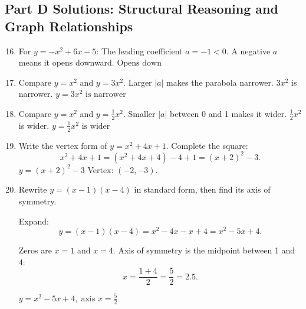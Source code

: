 \documentclass[12pt]{article}
\begin{document}
\subsection*{Part D Solutions: Structural Reasoning and Graph Relationships}
\begin{enumerate}
  \setcounter{enumi}{15}
  \item For \(y = -x^2 + 6x - 5\):  
  The leading coefficient \(a = -1 < 0\).  
  A negative \(a\) means it opens downward.  
  \(\boxed{\text{Opens down}}\)

  \item Compare \(y = x^2\) and \(y = 3x^2\).  
  Larger \(|a|\) makes the parabola narrower.  
  \(3x^2\) is narrower.  
  \(\boxed{y = 3x^2 \text{ is narrower}}\)

  \item Compare \(y = x^2\) and \(y = \tfrac{1}{2}x^2\).  
  Smaller \(|a|\) between 0 and 1 makes it wider.  
  \(\tfrac{1}{2}x^2\) is wider.  
  \(\boxed{y = \tfrac{1}{2}x^2 \text{ is wider}}\)

  \item Write the vertex form of \(y = x^2 + 4x + 1\).  
  Complete the square:  
  \[
  x^2 + 4x + 1 = (x^2 + 4x + 4) - 4 + 1 = (x + 2)^2 - 3.
  \]
  \(\boxed{y = (x + 2)^2 - 3}\)  
  Vertex: \((-2, -3)\).

  \item Rewrite \(y = (x - 1)(x - 4)\) in standard form, then find its axis of symmetry.

  Expand:  
  \[
  y = (x - 1)(x - 4) = x^2 - 4x - x + 4 = x^2 - 5x + 4.
  \]

  Zeros are \(x = 1\) and \(x = 4\).  
  Axis of symmetry is the midpoint between 1 and 4:  
  \[
  x = \frac{1 + 4}{2} = \frac{5}{2} = 2.5.
  \]

  \(\boxed{y = x^2 - 5x + 4,\; \text{axis } x = \frac{5}{2}}\)
\end{enumerate}
\end{document}
